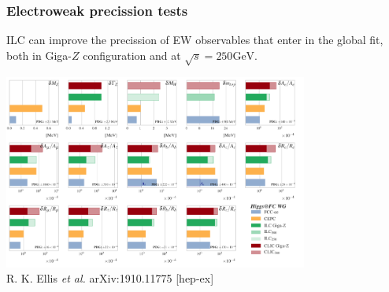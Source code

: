 \documentclass[mathserif, 10pt, dvipsnames]{beamer}
\newcommand\colorcite[1]{{\scriptsize\color{unizarblue}#1}}
\begin{document}
\begin{frame}
        \frametitle{Electroweak precission tests}
        ILC can improve the precission of EW observables that enter in the global fit, both in Giga-$Z$ configuration and at $\sqrt{s} = 250 \mathrm{GeV}$.
        \begin{center}
        \includegraphics[width=0.75\textwidth]{figures/EWPO}\\
        \colorcite{R. K. Ellis \textit{et al.} arXiv:1910.11775 [hep-ex]}
        \end{center}
\end{frame}
        
        
\end{document}
